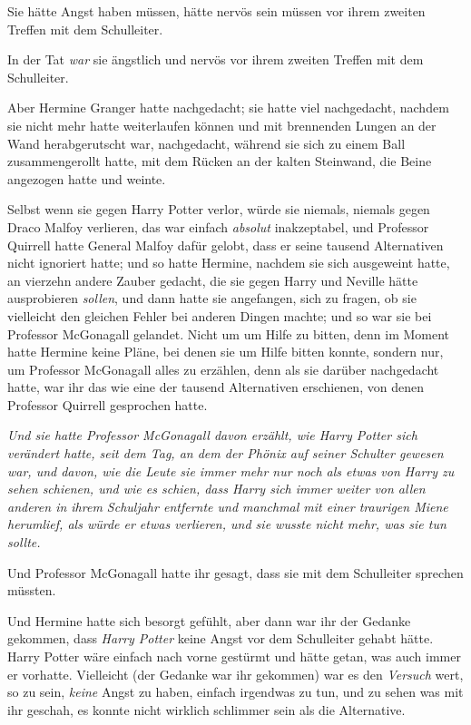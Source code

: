 {Sie hätte Angst haben müssen, hätte nervös sein müssen vor ihrem zweiten Treffen mit dem Schulleiter.

In der Tat \emph{war} sie ängstlich und nervös vor ihrem zweiten Treffen mit dem Schulleiter.

Aber Hermine Granger hatte nachgedacht; sie hatte viel nachgedacht, nachdem sie nicht mehr hatte weiterlaufen können und mit brennenden Lungen an der Wand herabgerutscht war, nachgedacht, während sie sich zu einem Ball zusammengerollt hatte, mit dem Rücken an der kalten Steinwand, die Beine angezogen hatte und weinte.

Selbst wenn sie gegen Harry Potter verlor, würde sie niemals, niemals gegen Draco Malfoy verlieren, das war einfach \emph{absolut} inakzeptabel, und Professor Quirrell hatte General Malfoy dafür gelobt, dass er seine tausend Alternativen nicht ignoriert hatte; und so hatte Hermine, nachdem sie sich ausgeweint hatte, an vierzehn andere Zauber gedacht, die sie gegen Harry und Neville hätte ausprobieren \emph{sollen}, und dann hatte sie angefangen, sich zu fragen, ob sie vielleicht den gleichen Fehler bei anderen Dingen machte; und so war sie bei Professor McGonagall gelandet. Nicht um um Hilfe zu bitten, denn im Moment hatte Hermine keine Pläne, bei denen sie um Hilfe bitten konnte, sondern nur, um Professor McGonagall alles zu erzählen, denn als sie darüber nachgedacht hatte, war ihr das wie eine der tausend Alternativen erschienen, von denen Professor Quirrell gesprochen hatte.

\emph{Und sie hatte Professor McGonagall davon erzählt, wie Harry Potter sich verändert hatte, seit dem Tag, an dem der Phönix auf seiner Schulter gewesen war, und davon, wie die Leute sie immer mehr nur noch als etwas von Harry zu sehen schienen, und wie es schien, dass Harry sich immer weiter von allen anderen in ihrem Schuljahr entfernte und manchmal mit einer traurigen Miene herumlief, als würde er etwas verlieren, und \emph{sie wusste nicht mehr, was sie tun sollte.}}

Und Professor McGonagall hatte ihr gesagt, dass sie mit dem Schulleiter sprechen müssten.

Und Hermine hatte sich besorgt gefühlt, aber dann war ihr der Gedanke gekommen, dass \emph{Harry Potter} keine Angst vor dem Schulleiter gehabt hätte. Harry Potter wäre einfach nach vorne gestürmt und hätte getan, was auch immer er vorhatte. Vielleicht (der Gedanke war ihr gekommen) war es den \emph{Versuch} wert, so zu sein, \emph{keine} Angst zu haben, einfach irgendwas zu tun, und zu sehen was mit ihr geschah, es konnte nicht wirklich schlimmer sein als die Alternative.

}
